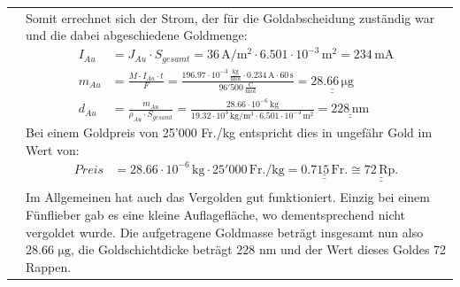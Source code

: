 \begin{longtable}{p{3cm}p{14cm}}
    & Somit errechnet sich der Strom, der für die Goldabscheidung zuständig war und die dabei abgeschiedene Goldmenge:
    $$\begin{aligned}
        I_{Au} &= J_{Au} \cdot S_{gesamt} = 36 \, \mathrm{A/m^2} \cdot 6.501 \cdot 10^{-3} \, \mathrm{m^2} = 234 \, \mathrm{mA}\\
        m_{Au} &= \frac{M \cdot I_{Au} \cdot t}{F} = \frac{196.97 \cdot 10^{-3} \, \frac{\mathrm{kg}}{\mathrm{mol}} \cdot 0.234 \, \mathrm{A} \cdot 60 \, \mathrm{s}}{96'500 \, \frac{\mathrm{C}}{\mathrm{mol}}} = \underline{\underline{28.66 \, \mathrm{\mu g}}}\\
        d_{Au} &= \frac{m_{Au}}{\rho_{Au} \cdot S_{gesamt}} = \frac{28.66 \cdot 10^{-6} \, \mathrm{kg}}{19.32 \cdot 10^3 \, \mathrm{kg/m^3} \cdot 6.501 \cdot 10^{-3} \, \mathrm{m^2}} = \underline{\underline{228 \, \mathrm{nm}}}
    \end{aligned}$$
    Bei einem Goldpreis von 25'000 Fr./kg entspricht dies in ungefähr Gold im Wert von:
    $$\begin{aligned}
        Preis &= 28.66 \cdot 10^{-6} \, \mathrm{kg} \cdot 25'000 \, \mathrm{Fr./kg} = \underline{\underline{0.715  \, \mathrm{Fr.}}} \cong \underline{\underline{72 \, \mathrm{Rp.}}}
    \end{aligned}$$\\
    
    & Im Allgemeinen hat auch das Vergolden gut funktioniert. Einzig bei einem Fünflieber gab es eine kleine Auflagefläche, wo dementsprechend nicht vergoldet wurde. Die aufgetragene Goldmasse beträgt insgesamt nun also 28.66 $\mathrm{\mu g}$, die Goldschichtdicke beträgt 228 nm und der Wert dieses Goldes 72 Rappen.
    
\end{longtable}